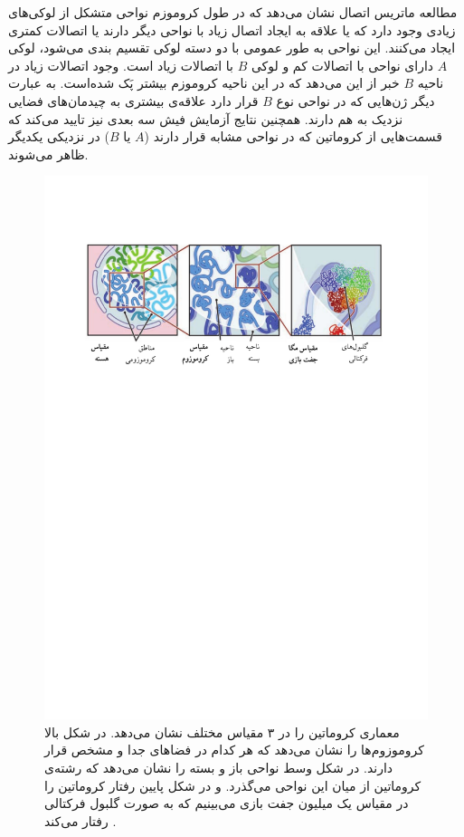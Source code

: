 مطالعه ماتریس اتصال نشان می‌دهد که در طول کروموزم نواحی متشکل از لوکی‌های زیادی وجود دارد که یا علاقه به ایجاد اتصال زیاد با نواحی دیگر دارند یا اتصالات کمتری ایجاد می‌کنند. این نواحی  به طور عمومی‌ با دو دسته لوکی تقسیم بندی می‌شود، لوکی $A$ دارای نواحی با اتصالات کم و لوکی $B$ با اتصالات زیاد است. وجود اتصالات زیاد در ناحیه $B$ خبر از این می‌دهد که در این ناحیه کروموزم بیشتر پَک  شده‌است. به عبارت دیگر ژن‌هایی که در نواحی نوع $B$ قرار دارد علاقه‌ی بیشتری به چیدمان‌های فضایی نزدیک به هم دارند. همچنین نتایج آزمایش‌ فیش سه بعدی نیز تایید می‌کند که قسمت‌هایی از کروماتین که در نواحی مشابه قرار دارند ($A$ یا $B$) در نزدیکی یکدیگر ظاهر می‌شوند. 
\begin{figure}[htbp]
\begin{center}
\includegraphics[width=4.5in]{Figs/chromatin_coarse_grained}
\caption{
 معماری کروماتین را در ۳ مقیاس مختلف نشان می‌دهد. در شکل بالا کروموزوم‌ها را نشان می‌دهد که هر کدام در فضا‌های جدا و مشخص قرار دارند. در شکل وسط نواحی باز و بسته را نشان می‌دهد که رشته‌ی کروماتین از میان این نواحی می‌گذرد. و در شکل پایین رفتار کروماتین را در مقیاس یک میلیون جفت بازی می‌بینیم که به صورت گلبول فرکتالی رفتار می‌کند \cite{Lieberman-Aiden289}.
}
\label{fig:chromo_coarse}
\end{center}
\end{figure}

